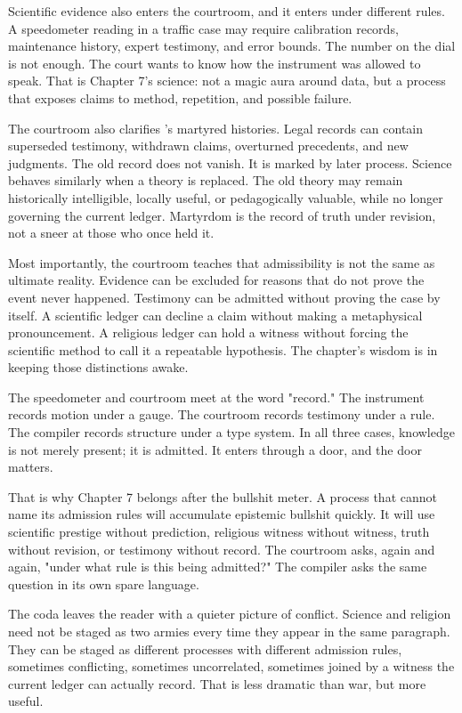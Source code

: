 Scientific evidence also enters the courtroom, and it enters under different
rules. A speedometer reading in a traffic case may require calibration records,
maintenance history, expert testimony, and error bounds. The number on the dial
is not enough. The court wants to know how the instrument was allowed to speak.
That is Chapter 7's science: not a magic aura around data, but a process that
exposes claims to method, repetition, and possible failure.

The courtroom also clarifies 's martyred histories. Legal records
can contain superseded testimony, withdrawn claims, overturned precedents, and
new judgments. The old record does not vanish. It is marked by later process.
Science behaves similarly when a theory is replaced. The old theory may remain
historically intelligible, locally useful, or pedagogically valuable, while no
longer governing the current ledger. Martyrdom is the record of truth under
revision, not a sneer at those who once held it.

Most importantly, the courtroom teaches that admissibility is not the same as
ultimate reality. Evidence can be excluded for reasons that do not prove the
event never happened. Testimony can be admitted without proving the case by
itself. A scientific ledger can decline a claim without making a metaphysical
pronouncement. A religious ledger can hold a witness without forcing the
scientific method to call it a repeatable hypothesis. The chapter's wisdom is
in keeping those distinctions awake.

The speedometer and courtroom meet at the word "record." The instrument records
motion under a gauge. The courtroom records testimony under a rule. The
compiler records structure under a type system. In all three cases, knowledge
is not merely present; it is admitted. It enters through a door, and the door
matters.

That is why Chapter 7 belongs after the bullshit meter. A process that cannot
name its admission rules will accumulate epistemic bullshit quickly. It will
use scientific prestige without prediction, religious witness without witness,
truth without revision, or testimony without record. The courtroom asks, again
and again, "under what rule is this being admitted?" The compiler asks the same
question in its own spare language.

The coda leaves the reader with a quieter picture of conflict. Science and
religion need not be staged as two armies every time they appear in the same
paragraph. They can be staged as different processes with different admission
rules, sometimes conflicting, sometimes uncorrelated, sometimes joined by a
witness the current ledger can actually record. That is less dramatic than war,
but more useful.

